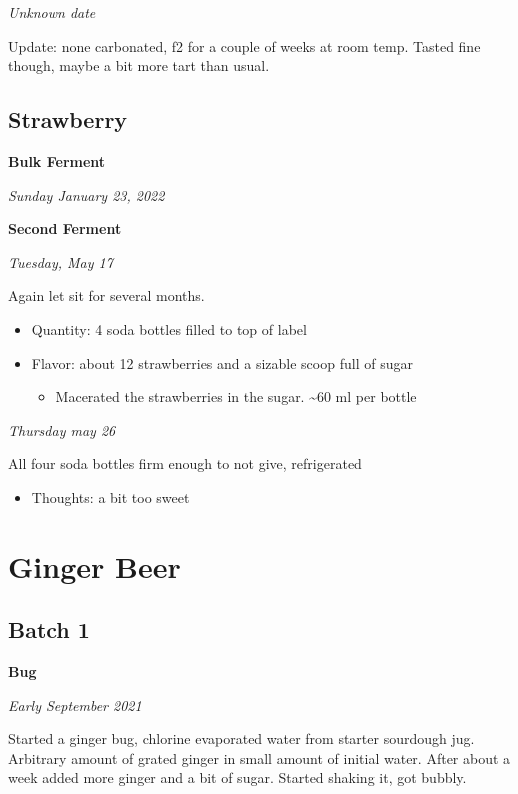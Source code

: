 \documentclass[
]{book}
\providecommand{\tightlist}{%
  \setlength{\itemsep}{0pt}\setlength{\parskip}{0pt}}
\begin{document}
\emph{Unknown date}

Update: none carbonated, f2 for a couple of weeks at room temp. Tasted fine though, maybe a bit more tart than usual.

\hypertarget{strawberry}{%
\section{Strawberry}\label{strawberry}}

\textbf{Bulk Ferment}

\emph{Sunday January 23, 2022}

\textbf{Second Ferment}

\emph{Tuesday, May 17}

Again let sit for several months.

\begin{itemize}
\tightlist
\item
  Quantity: 4 soda bottles filled to top of label
\item
  Flavor: about 12 strawberries and a sizable scoop full of sugar

  \begin{itemize}
  \tightlist
  \item
    Macerated the strawberries in the sugar. \textasciitilde60 ml per bottle
  \end{itemize}
\end{itemize}

\emph{Thursday may 26}

All four soda bottles firm enough to not give, refrigerated

\begin{itemize}
\tightlist
\item
  Thoughts: a bit too sweet
\end{itemize}

\hypertarget{ginger-beer}{%
\chapter{Ginger Beer}\label{ginger-beer}}

\hypertarget{batch-1}{%
\section{Batch 1}\label{batch-1}}

\textbf{Bug}

\emph{Early September 2021}

Started a ginger bug, chlorine evaporated water from starter sourdough jug. Arbitrary amount of grated ginger in small amount of initial water. After about a week added more ginger and a bit of sugar. Started shaking it, got bubbly.
\end{document}
